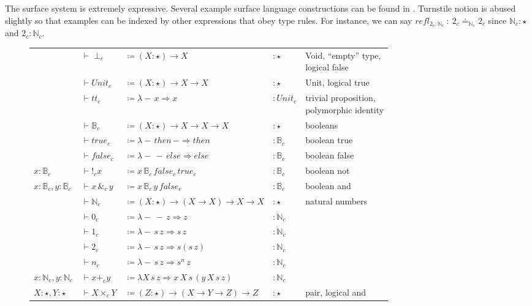 The surface system is extremely expressive.
Several example surface language constructions can be found in .
Turnstile notion is abused slightly so that examples can be indexed by other expressions that obey type rules.
For instance, we can say $refl_{2_{c}:\mathbb{N}_{c}}\ :\ 2_{c}\doteq_{\mathbb{N}_{c}}2_{c}$ since $\mathbb{N}_{c}:\star$ and $2_{c}:\mathbb{N}_{c}$.

\begin{sidewaysfigure}
\begin{tabular}{lllll}
  & $\vdash\perp_{c}$ & $\coloneqq\left(X:\star\right)\rightarrow X$ & $:\star$ & \makecell[l]{Void, ``empty'' type,\\ logical false}\tabularnewline
  & $\vdash Unit_{c}$ & $\coloneqq\left(X:\star\right)\rightarrow X\rightarrow X$ & $:\star$ & Unit, logical true\tabularnewline
  & $\vdash tt_{c}$ & $\coloneqq\lambda-\,x\Rightarrow x$ & $:Unit_{c}$ & \makecell[l]{trivial proposition,\\ polymorphic identity}\tabularnewline
  & $\vdash\mathbb{B}_{c}$ & $\coloneqq\left(X:\star\right)\rightarrow X\rightarrow X\rightarrow X$ & $:\star$ & booleans\tabularnewline
  & $\vdash true_{c}$ & $\coloneqq\lambda-\,then\,-\Rightarrow then$ & $:\mathbb{B}_{c}$ & boolean true\tabularnewline
  & $\vdash false_{c}$ & $\coloneqq\lambda-\,-\,else\Rightarrow else$ & $:\mathbb{B}_{c}$ & boolean false\tabularnewline
$x:\mathbb{B}_{c}$ & $\vdash!_{c}x$ & $\coloneqq x\,\mathbb{B}_{c}\,false_{c}\,true_{c}$ & $:\mathbb{B}_{c}$ & boolean not\tabularnewline
$x:\mathbb{B}_{c},y:\mathbb{B}_{c}$ & $\vdash x\,\&_{c}\,y$ & $\coloneqq x\,\mathbb{B}_{c}\,y\,false_{c}$ & $:\mathbb{B}_{c}$ & boolean and\tabularnewline
  & $\vdash\mathbb{N}_{c}$ & $\coloneqq\left(X:\star\right)\rightarrow(X\rightarrow X)\rightarrow X\rightarrow X$ & $:\star$ & natural numbers\tabularnewline
  & $\vdash0_{c}$ & $\coloneqq\lambda-\,-\,z\Rightarrow z$ & $:\mathbb{N}_{c}$ & \tabularnewline
  & $\vdash1_{c}$ & $\coloneqq\lambda-\,s\,z\Rightarrow s\,z$ & $:\mathbb{N}_{c}$ & \tabularnewline
  & $\vdash2_{c}$ & $\coloneqq\lambda-\,s\,z\Rightarrow s\left(s\,z\right)$ & $:\mathbb{N}_{c}$ & \tabularnewline
  & $\vdash n_{c}$ & $\coloneqq\lambda-\,s\,z\Rightarrow s^{n}\,z$ & $:\mathbb{N}_{c}$ & \tabularnewline
$x:\mathbb{N}_{c},y:\mathbb{N}_{c}$ & $\vdash x+_{c}y$ & $\coloneqq\lambda X\,s\,z\Rightarrow x\,X\,s\,\left(y\,X\,s\,z\right)$ & $:\mathbb{N}_{c}$ & \tabularnewline
$X:\star,Y:\star$ & $\vdash X\times_{c}Y$ & $\coloneqq\left(Z:\star\right)\rightarrow(X\rightarrow Y\rightarrow Z)\rightarrow Z$ & $:\star$ & pair, logical and\tabularnewline

\end{tabular}
\end{sidewaysfigure}
